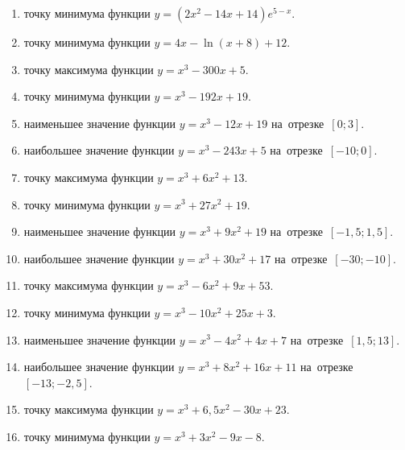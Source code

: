 \documentclass[a4paper,10pt]{article}
\begin{document}
\begin{enumerate}
\item {} точку минимума функции $y=\left(2x^2-14x+14\right){{e}^{5-x}}$.

\item {} точку минимума функции $y=4x-\ln \left(x+8\right)+12$.

\item {} точку максимума функции $y=x^3 -300x +5$.

\item {} точку минимума функции $y=x^3 -192x+19$.

\item {} наименьшее значение функции $y=x^3 -12x+19$ на~отрезке~$\left[0;3\right]$.

\item {} наибольшее значение функции $y=x^3 -243x+5$ на~отрезке~$\left[-10;0\right]$.

\item {} точку максимума функции $y=x^3 +6x^2+13$.

\item {} точку минимума функции $y=x^3 +27x^2+19$.

\item {} наименьшее значение функции $y=x^3 +9x^2+19$ на~отрезке~$\left[-1,5;1,5\right]$.

\item {} наибольшее значение функции $y=x^3 +30x^2+17$ на~отрезке~$\left[-30;-10\right]$.

\item {} точку максимума функции $y=x^3 -6x^2+9x+53$.

\item {} точку минимума функции $y=x^3 -10x^2+25x+3$.

\item {} наименьшее значение функции $y=x^3 -4x^2+4x+7$ на~отрезке~$\left[1,5;13\right]$.

\item {} наибольшее значение функции $y=x^3 +8x^2+16x+11$ на~отрезке~$\left[-13;-2,5\right]$.

\item {} точку максимума функции $y=x^3 +6,5x^2-30x+23$.

\item {} точку минимума функции $y=x^3 +3x^2-9x-8$.


\end{enumerate}
\end{document}
